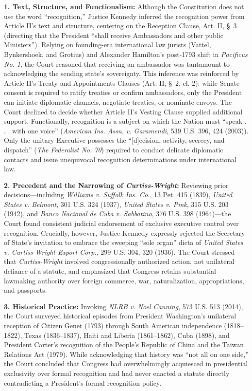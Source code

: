 \documentclass[12pt]{article}
\begin{document}
\textbf{1. Text, Structure, and Functionalism:} Although the Constitution does not use the word ``recognition,'' Justice Kennedy inferred the recognition power from Article II's text and structure, centering on the Reception Clause, Art. II, \S~3 (directing that the President ``shall receive Ambassadors and other public Ministers''). Relying on founding-era international law jurists (Vattel, Bynkershoek, and Grotius) and Alexander Hamilton's post-1793 shift in \textit{Pacificus No. 1}, the Court reasoned that receiving an ambassador was tantamount to acknowledging the sending state's sovereignty. This inference was reinforced by Article II's Treaty and Appointments Clauses (Art. II, \S~2, cl. 2): while Senate consent is required to ratify treaties or confirm ambassadors, only the President can initiate diplomatic channels, negotiate treaties, or nominate envoys. The Court declined to decide whether Article II's Vesting Clause supplied additional support. Functionally, recognition is a subject on which the Nation must ``speak . . . with one voice'' (\textit{American Ins. Assn. v. Garamendi}, 539 U.S. 396, 424 (2003)). Only the unitary Executive possesses the ``[d]ecision, activity, secrecy, and dispatch'' (\textit{The Federalist No. 70}) required to conduct delicate diplomatic contacts and issue unequivocal recognition determinations under international law.

\textbf{2. Precedent and the Narrowing of \textit{Curtiss-Wright}:} Reviewing prior decisions---including \textit{Williams v. Suffolk Ins. Co.}, 13 Pet. 415 (1839), \textit{United States v. Belmont}, 301 U.S. 324 (1937), \textit{United States v. Pink}, 315 U.S. 203 (1942), and \textit{Banco Nacional de Cuba v. Sabbatino}, 376 U.S. 398 (1964)---the Court found consistent judicial endorsement of exclusive executive control over recognition. Crucially, however, Justice Kennedy expressly rejected the Secretary of State's invitation to embrace the sweeping ``sole organ'' dicta of \textit{United States v. Curtiss-Wright Export Corp.}, 299 U.S. 304, 320 (1936). The Court stressed that \textit{Curtiss-Wright} involved congressionally authorized action, not unilateral defiance of a statute, and emphasized that Congress retains substantial lawmaking authority over foreign commerce, war, naturalization, appropriations, and passports.

\textbf{3. Historical Practice:} Invoking \textit{NLRB v. Noel Canning}, 573 U.S. 513 (2014), the Court surveyed historical episodes from President Washington's unilateral reception of Citizen Genet (1793) through South American independence (1818--1822), Texas (1836--1837), Haiti and Liberia (1861--1862), Cuba (1898), and President Carter's recognition of the People's Republic of China and the Taiwan Relations Act (1979). While acknowledging that history was ``not all on one side,'' the Court concluded that Congress had overwhelmingly acquiesced in presidential exclusivity over formal recognition and had never enacted a statute directly contradicting a President's formal recognition policy.
\end{document}
